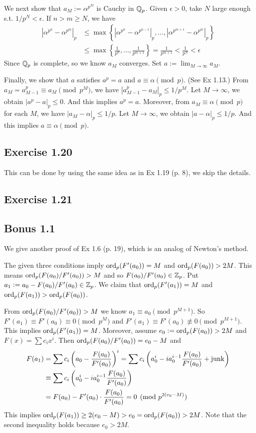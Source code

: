 \documentclass[../Koblitz.tex]{subfiles}
\begin{document}
We next show that $a_M:=\alpha^{p^M}$ is Cauchy in $\mathbb{Q}_p$. Given $\epsilon>0$, take $N$ large enough s.t. $1/p^N<\epsilon$. If $n>m\geq N$, we have
\begin{align*}
\left|\alpha^{p^n}-\alpha^{p^m}\right|_p &\leq \max\left\{ \left|\alpha^{p^n}-\alpha^{p^{n-1}}\right|_p,\ldots,\left|\alpha^{p^{m+1}}-\alpha^{p^m}\right|_p \right\} \\
&\leq \max \left\{ \frac{1}{p^n},\ldots,\frac{1}{p^{m+1}} \right\} = \frac{1}{p^{m+1}} < \frac{1}{p^N} <\epsilon
\end{align*}
Since $\mathbb{Q}_p$ is complete, so we know $a_M$ converges. Set $a:=\lim_{M\to\infty} a_M$.

Finally, we show that $a$ satisfies $a^p=a$ and $a\equiv\alpha\pmod{p}$. (See Ex 1.13.) From $a_M = a_{M-1}^p \equiv a_M \pmod{p^M}$, we have $|a_{M-1}^p-a_M|_p\leq 1/p^M$. Let $M\to\infty$, we obtain $|a^p-a|_p\leq 0$. And this implies $a^p=a$. Moreover, from $a_M\equiv\alpha\pmod{p}$ for each $M$, we have $|a_M-\alpha|_p\leq 1/p$. Let $M\to\infty$, we obtain $|a-\alpha|_p\leq 1/p$. And this implies $a\equiv\alpha\pmod{p}$.

\subsection*{Exercise 1.20}

This can be done by using the same idea as in Ex 1.19 (p. 8), we skip the details.

\subsection*{Exercise 1.21}

\subsection*{Bonus 1.1} \label{Bonus 1.1}

We give another proof of Ex 1.6 (p. 19), which is an analog of Newton's method.

The given three conditions imply $\operatorname{ord}_p(F'(a_0))=M$ and $\operatorname{ord}_p(F(a_0))>2M$. This means $\operatorname{ord}_p(F(a_0)/F'(a_0))>M$ and so $F(a_0)/F'(a_0)\in\mathbb{Z}_p$. Put $a_1:=a_0-F(a_0)/F'(a_0)\in\mathbb{Z}_p$. We claim that $\operatorname{ord}_p(F'(a_1))=M$ and $\operatorname{ord}_p(F(a_1))>\operatorname{ord}_p(F(a_0))$.

From $\operatorname{ord}_p(F(a_0)/F'(a_0))>M$ we know $a_1\equiv a_0 \pmod{p^{M+1}}$. So $F'(a_1)\equiv F'(a_0)\equiv0\pmod{p^M}$ and $F'(a_1)\equiv F'(a_0)\not\equiv0\pmod{p^{M+1}}$. This implies $\operatorname{ord}_p(F'(a_1))=M$. Moreover, assume $e_0:=\operatorname{ord}_p(F(a_0))>2M$ and $F(x)=\sum c_ix^i$. Then $\operatorname{ord}_p(F(a_0)/F'(a_0))=e_0-M$ and
\begin{align*}
F(a_1) &= \sum c_i\left(a_0-\frac{F(a_0)}{F'(a_0)}\right)^i = \sum c_i\left(a_0^i - ia_0^{i-1}\frac{F(a_0)}{F'(a_0)}+\operatorname{junk}\right) \\
&\equiv \sum c_i\left(a_0^i - ia_0^{i-1}\frac{F(a_0)}{F'(a_0)}\right) \\
&= F(a_0) - F'(a_0)\cdot\frac{F(a_0)}{F'(a_0)} = 0 \pmod{p^{2(e_0-M)}}
\end{align*}
This implies $\operatorname{ord}_p(F(a_1)) \geq 2(e_0-M) > e_0 = \operatorname{ord}_p(F(a_0)) > 2M$. Note that the second inequality holds because $e_0>2M$.
\end{document}
